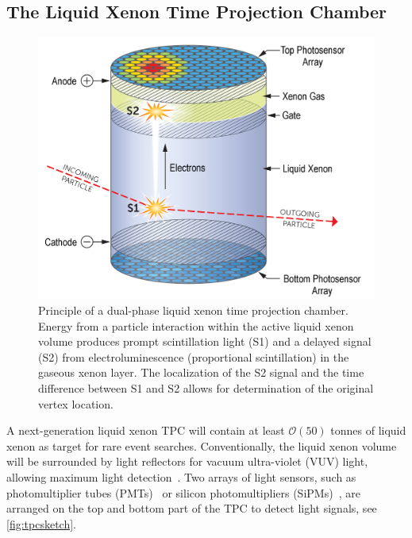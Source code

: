 \subsection{The Liquid Xenon Time Projection Chamber}

\begin{figure}[!htbp]
\begin{center}
\includegraphics[width=0.99\columnwidth]{fig_tpc-mo_lifton.jpg}
\caption{Principle of a dual-phase liquid xenon time projection chamber. Energy from a particle interaction within the active liquid xenon volume produces prompt scintillation light (S1) and a delayed signal (S2) from electroluminescence (proportional scintillation) in the gaseous xenon layer. The localization of the S2 signal and the time difference between S1 and S2 allows for determination of the original vertex location.}\label{fig:tpcsketch}
\end{center}
\end{figure}

A next-generation liquid xenon TPC will contain at least $\mathcal{O}(50)$ tonnes of liquid xenon as target for rare event searches. Conventionally, the liquid xenon volume will be surrounded by light reflectors for vacuum ultra-violet (VUV) light, allowing maximum light detection~\cite{Aprile:2004ey}. Two arrays of light sensors, such as photomultiplier tubes (PMTs)~\cite{Akerib:2012da,XENON:2015ara} or silicon photomultipliers (SiPMs)~\cite{Aprile:2005qq,Baudis:2020nwe}, are arranged on the top and bottom part of the TPC to detect light signals, see \autoref{fig:tpcsketch}. 

